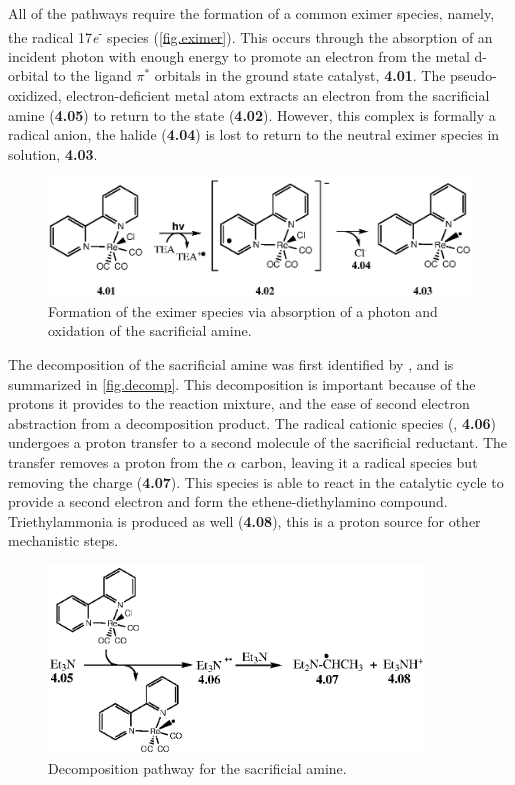 All of the pathways require the formation of a common eximer species, namely, the radical 17\textit{e}\textsuperscript{-} species (\autoref{fig.eximer}). This occurs through the absorption of an incident photon with enough energy to promote an electron from the metal d-orbital to the ligand $\pi^\ast$ orbitals in the ground state catalyst, \textbf{4.01}. The pseudo-oxidized, electron-deficient metal atom extracts an electron from the sacrificial amine (\textbf{4.05}) to return to the  state (\textbf{4.02}). However, this complex is formally a radical anion, the halide (\textbf{4.04}) is lost to return to the neutral eximer species in solution, \textbf{4.03}. 

\begin{figure}[!htb]
 \begin{center}
  \includegraphics[clip=true, width=120mm, keepaspectratio]{images/eximer.eps}
 \end{center}
\caption{Formation of the eximer species via absorption of a photon and oxidation of the sacrificial amine.}
\label{fig.eximer}
\end{figure} 

The decomposition of the sacrificial amine was first identified by , and is summarized in \autoref{fig.decomp}. This decomposition is important because of the protons it provides to the reaction mixture, and the ease of second electron abstraction from a decomposition product. The radical cationic species (, \textbf{4.06}) undergoes a proton transfer to a second molecule of the sacrificial reductant. The transfer removes a proton from the $\alpha$ carbon, leaving it a radical species but removing the charge (\textbf{4.07}). This species is able to react in the catalytic cycle to provide a second electron and form the ethene-diethylamino compound. Triethylammonia is produced as well (\textbf{4.08}), this is a proton source for other mechanistic steps.

\begin{figure}[!htb]
 \begin{center}
  \includegraphics[clip=true, width=100mm, keepaspectratio]{images/reddecomp.eps}
 \end{center}
\caption{Decomposition pathway for the sacrificial amine.}
\label{fig.decomp}
\end{figure} 

